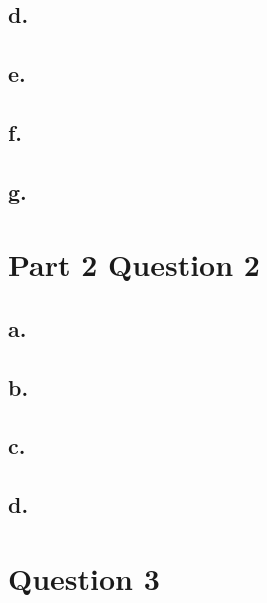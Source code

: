 \documentclass{article}
\theoremstyle{plain}
\theoremstyle{definition}
\theoremstyle{remark}
\begin{document}
\subsection*{d.}

\subsection*{e.}

\subsection*{f.}

\subsection*{g.}

\section{Part 2 Question 2}

\subsection*{a.}

\subsection*{b.}

\subsection*{c.}

\subsection*{d.}

\section*{Question 3}
\end{document}
